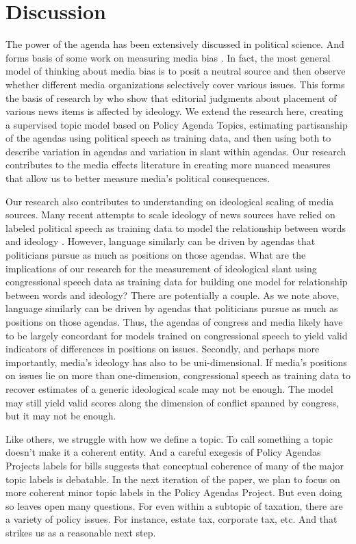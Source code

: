 \documentclass[12pt, letterpaper]{article}
\begin{document}
\section*{Discussion}
The power of the agenda has been extensively discussed in political science. And forms basis of some work on measuring media bias \citep[see for instance,]{larcinese2011partisan}. In fact, the most general model of thinking about media bias is to posit a neutral source and then observe whether different media organizations selectively cover various issues. This forms the basis of research by \citep{baum2008new} who show that editorial judgments about placement of various news items is affected by ideology. We extend the research here, creating a supervised topic model based on Policy Agenda Topics, estimating partisanship of the agendas using political speech as training data, and then using both to describe variation in agendas and variation in slant within agendas. Our research contributes to the media effects literature in creating more nuanced measures that allow us to better measure media's political consequences. 

Our research also contributes to understanding on ideological scaling of media sources. Many recent attempts to scale ideology of news sources have relied on labeled political speech as training data to model the relationship between words and ideology \citep{groseclose2005, gentzkow2010}. However, language similarly can be driven by agendas that politicians pursue as much as positions on those agendas. What are the implications of our research for the measurement of ideological slant using congressional speech data as training data for building one model for relationship between words and ideology? There are potentially a couple. As we note above, language similarly can be driven by agendas that politicians pursue as much as positions on those agendas. Thus, the agendas of congress and media likely have to be largely concordant for models trained on congressional speech to yield valid indicators of differences in positions on issues. Secondly, and perhaps more importantly, media's ideology has also to be uni-dimensional. If media's positions on issues lie on more than one-dimension, congressional speech as training data to recover estimates of a generic ideological scale may not be enough. The model may still yield valid scores along the dimension of conflict spanned by congress, but it may not be enough.

Like others, we struggle with how we define a topic. To call something a topic doesn't make it a coherent entity. And a careful exegesis of Policy Agendas Projects labels for bills suggests that conceptual coherence of many of the major topic labels is debatable. In the next iteration of the paper, we plan to focus on more coherent minor topic labels in the Policy Agendas Project. But even doing so leaves open many questions. For even within a subtopic of taxation, there are a variety of policy issues. For instance, estate tax, corporate tax, etc. And that strikes us as a reasonable next step.
\end{document}
